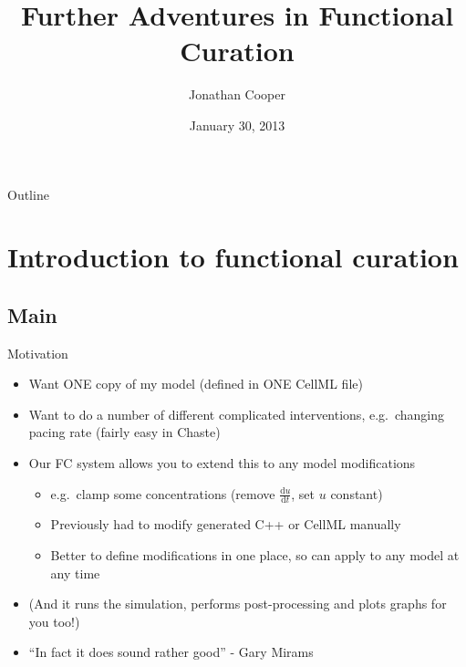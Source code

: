\documentclass[t,xcolor={usenames,dvipsnames}]{beamer}
\title{Further Adventures in Functional Curation}
\author{Jonathan Cooper}
\institute[University of Oxford]
{Computational Biology Group\\
 Department of Computer Science\\
 University of Oxford}
\date{January 30, 2013}
\newcommand{\ud}{\mathrm{d}}
\newcommand{\dt}{\ud t}
\begin{document}
\begin{frame}
\titlepage
\end{frame}

\begin{frame}{Outline}
\setcounter{tocdepth}{1}
\tableofcontents
\end{frame}

\section{Introduction to functional curation}
\subsection*{Main}

\begin{frame}{Motivation}
\begin{itemize}
\item Want ONE copy of my model (defined in ONE CellML file)
\item Want to do a number of different complicated interventions, e.g.\ changing pacing rate (fairly easy in Chaste)
\item Our FC system allows you to extend this to any model modifications
  \begin{itemize}
  \item e.g.\ clamp some concentrations (remove $\frac{\ud u}{\dt}$, set $u$ constant)
  \item Previously had to modify generated C++ or CellML manually
  \item Better to define modifications in one place, so can apply to any model at any time
  \end{itemize}
\item (And it runs the simulation, performs post-processing and plots graphs for you too!)
\item ``In fact it does sound rather good'' - Gary Mirams
\end{itemize}
\end{frame}
\end{document}

